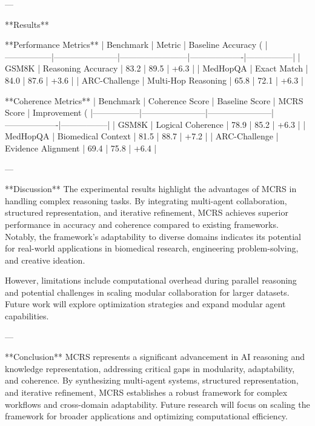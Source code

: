 ---

**Results**  

**Performance Metrics**  
| Benchmark       | Metric                | Baseline Accuracy (%
|-----------------|-----------------------|------------------------|-------------------|-----------------|
| GSM8K           | Reasoning Accuracy   | 83.2                  | 89.5              | +6.3            |
| MedHopQA        | Exact Match          | 84.0                  | 87.6              | +3.6            |
| ARC-Challenge   | Multi-Hop Reasoning  | 65.8                  | 72.1              | +6.3            |

**Coherence Metrics**  
| Benchmark       | Coherence Score      | Baseline Score        | MCRS Score        | Improvement (%
|-----------------|-----------------------|-----------------------|-------------------|-----------------|
| GSM8K           | Logical Coherence    | 78.9                  | 85.2              | +6.3            |
| MedHopQA        | Biomedical Context   | 81.5                  | 88.7              | +7.2            |
| ARC-Challenge   | Evidence Alignment   | 69.4                  | 75.8              | +6.4            |

---

**Discussion**  
The experimental results highlight the advantages of MCRS in handling complex reasoning tasks. By integrating multi-agent collaboration, structured representation, and iterative refinement, MCRS achieves superior performance in accuracy and coherence compared to existing frameworks. Notably, the framework's adaptability to diverse domains indicates its potential for real-world applications in biomedical research, engineering problem-solving, and creative ideation.

However, limitations include computational overhead during parallel reasoning and potential challenges in scaling modular collaboration for larger datasets. Future work will explore optimization strategies and expand modular agent capabilities.

---

**Conclusion**  
MCRS represents a significant advancement in AI reasoning and knowledge representation, addressing critical gaps in modularity, adaptability, and coherence. By synthesizing multi-agent systems, structured representation, and iterative refinement, MCRS establishes a robust framework for complex workflows and cross-domain adaptability. Future research will focus on scaling the framework for broader applications and optimizing computational efficiency.


